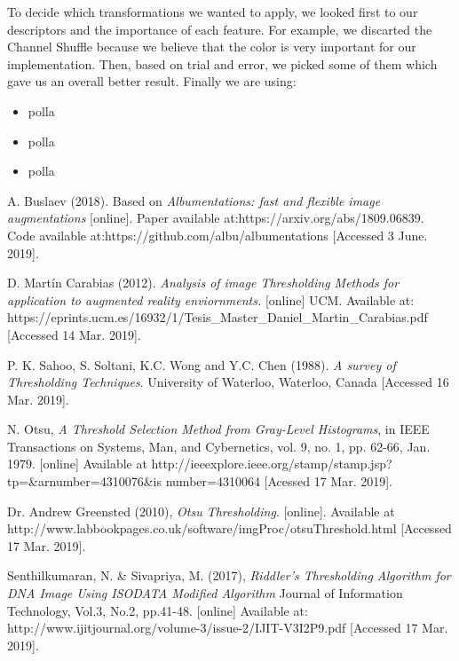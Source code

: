 \documentclass[12]{article}
\begin{document}
To decide which transformations we wanted to apply, we looked first to our descriptors and the importance of each feature. For example, we discarted the Channel Shuffle because we believe that the color is very important for our implementation. Then, based on trial and error, we picked some of them which gave us an overall better result. Finally we are using:
\begin{itemize}
    \item polla
    \item polla
    \item polla
\end{itemize}


\newpage
\begin{thebibliography}{100}

    A. Buslaev (2018). Based on \textit{Albumentations: fast and flexible image augmentations} [online]. Paper available at:https://arxiv.org/abs/1809.06839. Code available at:https://github.com/albu/albumentations  [Accessed 3 June. 2019].

D. Martín Carabias (2012). \textit{Analysis of image Thresholding Methods for application to augmented reality enviornments.} [online] UCM. Available at: https://eprints.ucm.es/16932/1/Tesis\_Master\_Daniel\_Martin\_Carabias.pdf [Accessed 14 Mar. 2019].


P. K. Sahoo, S. Soltani, K.C. Wong and Y.C. Chen (1988). \textit{A survey of Thresholding Techniques}. University of Waterloo, Waterloo, Canada  [Accessed 16 Mar. 2019].

\bibitem{}N. Otsu, \textit{A Threshold Selection Method from Gray-Level Histograms}, in IEEE Transactions on Systems, Man, and Cybernetics, vol. 9, no. 1, pp. 62-66, Jan. 1979.
[online] Available at http://ieeexplore.ieee.org/stamp/stamp.jsp?tp=\&arnumber=4310076\&is
number=4310064 [Acessed 17 Mar. 2019].

\bibitem{}Dr. Andrew Greensted (2010), \textit{Otsu Thresholding}. [online]. Available at http://www.labbookpages.co.uk/software/imgProc/otsuThreshold.html [Accessed 17 Mar. 2019].

\bibitem{}Senthilkumaran,  N.  \&  Sivapriya,  M.  (2017),  \textit{Riddler's  Thresholding Algorithm  for  DNA  Image  Using  ISODATA  Modified  Algorithm} Journal  of Information Technology, Vol.3, No.2, pp.41-48. [online] Available at: http://www.ijitjournal.org/volume-3/issue-2/IJIT-V3I2P9.pdf [Accessed 17 Mar. 2019].

\end{thebibliography}
\end{document}
